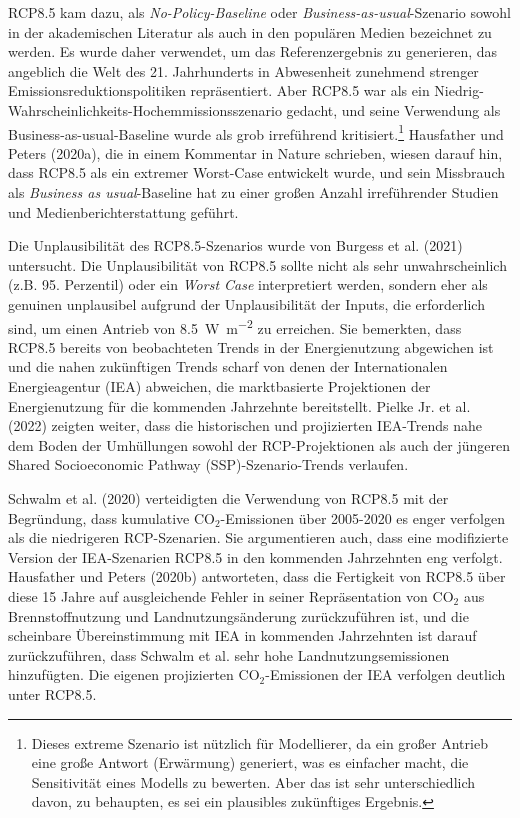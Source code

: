 \documentclass[12pt,paper=a4,DIV=12,parskip=never,chapterprefix=false,headings=standardclasses]{scrreprt}
\begin{document}
RCP8.5 kam dazu, als \emph{No-Policy-Baseline} oder \emph{Business-as-usual}-Szenario sowohl in der akademischen Literatur als auch in den populären Medien bezeichnet zu werden. Es wurde daher verwendet, um das Referenzergebnis zu generieren, das angeblich die Welt des 21. Jahrhunderts in Abwesenheit zunehmend strenger Emissionsreduktionspolitiken repräsentiert. Aber RCP8.5 war als ein Niedrig-Wahrscheinlichkeits-Hochemmissionsszenario gedacht, und seine Verwendung als Business-as-usual-Baseline wurde als grob irreführend kritisiert.\footnote{Dieses extreme Szenario ist nützlich für Modellierer, da ein großer Antrieb eine große Antwort (Erwärmung) generiert, was es einfacher macht, die Sensitivität eines Modells zu bewerten. Aber das ist sehr unterschiedlich davon, zu behaupten, es sei ein plausibles zukünftiges Ergebnis.} Hausfather und Peters (2020a), die in einem Kommentar in Nature schrieben, wiesen darauf hin, dass RCP8.5 als ein extremer Worst-Case entwickelt wurde, und sein Missbrauch als \emph{Business as usual}-Baseline hat zu einer großen Anzahl irreführender Studien und Medienberichterstattung geführt.

Die Unplausibilität des RCP8.5-Szenarios wurde von Burgess et al. (2021) untersucht. Die Unplausibilität von RCP8.5 sollte nicht als sehr unwahrscheinlich (z.B. 95. Perzentil) oder ein \emph{Worst Case} interpretiert werden, sondern eher als genuinen unplausibel aufgrund der Unplausibilität der Inputs, die erforderlich sind, um einen Antrieb von \SI{8.5}{\watt\per\square\meter} zu erreichen. Sie bemerkten, dass RCP8.5 bereits von beobachteten Trends in der Energienutzung abgewichen ist und die nahen zukünftigen Trends scharf von denen der Internationalen Energieagentur (IEA) abweichen, die marktbasierte Projektionen der Energienutzung für die kommenden Jahrzehnte bereitstellt. Pielke Jr. et al. (2022) zeigten weiter, dass die historischen und projizierten IEA-Trends nahe dem Boden der Umhüllungen sowohl der RCP-Projektionen als auch der jüngeren Shared Socioeconomic Pathway (SSP)-Szenario-Trends verlaufen.

Schwalm et al. (2020) verteidigten die Verwendung von RCP8.5 mit der Begründung, dass kumulative CO$_2$-Emissionen über 2005-2020 es enger verfolgen als die niedrigeren RCP-Szenarien. Sie argumentieren auch, dass eine modifizierte Version der IEA-Szenarien RCP8.5 in den kommenden Jahrzehnten eng verfolgt. Hausfather und Peters (2020b) antworteten, dass die Fertigkeit von RCP8.5 über diese 15 Jahre auf ausgleichende Fehler in seiner Repräsentation von CO$_2$ aus Brennstoffnutzung und Landnutzungsänderung zurückzuführen ist, und die scheinbare Übereinstimmung mit IEA in kommenden Jahrzehnten ist darauf zurückzuführen, dass Schwalm et al. sehr hohe Landnutzungsemissionen hinzufügten. Die eigenen projizierten CO$_2$-Emissionen der IEA verfolgen deutlich unter RCP8.5.
\end{document}
